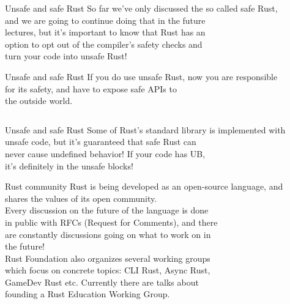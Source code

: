 \documentclass[usenames,dvipsnames,10pt,aspectratio=169]{beamer}
\begin{document}
\begin{frame}{Unsafe and safe Rust}
	\Large
	So far we've only discussed the so called \textcolor{ucuyellow}{safe Rust},\\
	and we are going to continue doing that in the future\\
	lectures, but it's important to know that Rust has an\\
	option to opt out of the compiler's safety checks and\\
	turn your code into \textcolor{ucuyellow}{unsafe} Rust!\end{frame}

\begin{frame}{Unsafe and safe Rust}
	\large
	If you do use unsafe Rust, now you are responsible\\
	for its safety, and have to expose safe APIs to\\
	the outside world.\\
	\vspace{0.5cm}
	\inputminted[fontsize=\large]{rust}{code/unsafe.rs}
\end{frame}

\begin{frame}{Unsafe and safe Rust}
	\Large
	Some of Rust's standard library is implemented with\\
	unsafe code, but it's guaranteed that safe Rust can\\
	never cause undefined behavior! If your code has UB,\\
	it's definitely in the unsafe blocks!\\
\end{frame}

\begin{frame}{Rust community}
	\large
	Rust is being developed as an open-source language, and\\
	shares the values of its open community.\\

	\vspace{0.3cm}
	Every discussion on the future of the language is done\\
	in public with RFCs (Request for Comments), and there\\
	are constantly discussions going on what to work on in\\
	the future!\\

	\vspace{0.3cm}
	Rust Foundation also organizes several working groups\\
	which focus on concrete topics: CLI Rust, Async Rust,\\
	GameDev Rust etc. Currently there are talks about\\
	founding a Rust Education Working Group.
\end{frame}

\end{document}
